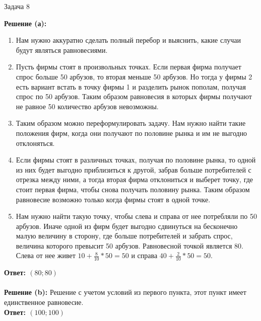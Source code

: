 \begin{mybox}{Задача 8}
\begin{center}
    \end{center}
    \tcblower
    \textbf{Решение (а):}
    \begin{enumerate}
        \item Нам нужно аккуратно сделать полный перебор и выяснить, какие случаи будут являться равновесиями.
        \item Пусть фирмы стоят в произвольных точках. Если первая фирма получает спрос больше 50 арбузов, то
        вторая меньше 50 арбузов. Но тогда у фирмы 2 есть вариант встать в точку фирмы 1 и разделить рынок пополам,
        получая спрос по 50 арбузов. Таким образом равновесия в которых фирмы получают не равное 50 количество
        арбузов невозможны.
        \item Таким образом можно переформулировать задачу. Нам нужно найти такие положения фирм, когда они получают
        по половине рынка и им не выгодно отклоняться.
        \item Если фирмы стоят в различных точках, получая по половине рынка, то одной из них будет выгодно
        приблизиться к другой, забрав больше потребителей с отрезка между ними, а тогда вторая фирма отклониться и
        выберет точку, где стоит первая фирма, чтобы снова получать половину рынка. Таким образом равновесие возможно
        только когда фирмы стоят в одной точке.
        \item Нам нужно найти такую точку, чтобы слева и справа от нее потребляли по 50 арбузов. Иначе одной из фирм
        будет выгодно сдвинуться на бесконечно малую величину в сторону, где больше потребителей и забрать спрос,
        величина которого превысит 50 арбузов. Равновесной точкой
        является 80. Слева от нее живет $10+\frac{8}{10}*50=50$ и справа $40+\frac{2}{10}*50=50$.
    \end{enumerate}
    \textbf{Ответ: $(80;80)$}\\\\
    \textbf{Решение (b):}
    Решение с учетом условий из первого пункта, этот пункт имеет единственное равновесие.\\
    \textbf{Ответ: $(100;100)$}
\end{mybox}


